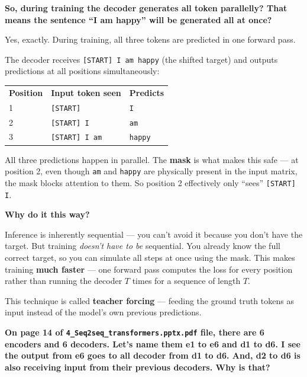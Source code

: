 \bigskip
\bigskip

\textbf{So, during training the decoder generates all token parallelly? That means the sentence ``I am happy'' will be generated all at once?}

\medskip

Yes, exactly. During training, all three tokens are predicted in one forward pass.

The decoder receives \texttt{[START] I am happy} (the shifted target) and outputs predictions at all positions simultaneously:

\begin{center}
\begin{tabular}{lll}
\textbf{Position} & \textbf{Input token seen} & \textbf{Predicts} \\[4pt]
1 & \texttt{[START]} & \texttt{I} \\
2 & \texttt{[START] I} & \texttt{am} \\
3 & \texttt{[START] I am} & \texttt{happy} \\
\end{tabular}
\end{center}

All three predictions happen in parallel. The \textbf{mask} is what makes this safe --- at position 2, even though \texttt{am} and \texttt{happy} are physically present in the input matrix, the mask blocks attention to them. So position 2 effectively only ``sees'' \texttt{[START] I}.

\bigskip

\textbf{Why do it this way?}

Inference is inherently sequential --- you can't avoid it because you don't have the target. But training \textit{doesn't have to be} sequential. You already know the full correct target, so you can simulate all steps at once using the mask. This makes training \textbf{much faster} --- one forward pass computes the loss for every position rather than running the decoder $T$ times for a sequence of length $T$.

This technique is called \textbf{teacher forcing} --- feeding the ground truth tokens as input instead of the model's own previous predictions.

\bigskip
\bigskip

\textbf{On page 14 of \texttt{4\_Seq2seq\_transformers.pptx.pdf} file, there are 6 encoders and 6 decoders. Let's name them e1 to e6 and d1 to d6. I see the output from e6 goes to all decoder from d1 to d6. And, d2 to d6 is also receiving input from their previous decoders. Why is that?}

